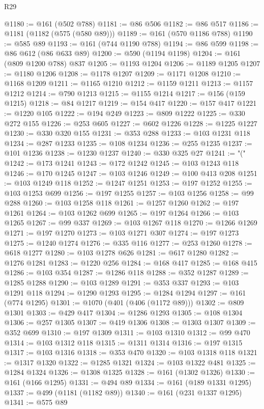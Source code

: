 \begin{lexlean}{R29}
\begin{coremodule}
@1180 := @161 (@502 @788)
@1181 := @86 @506
@1182 := @86 @517
@1186 := @1181 (@1182 (@575 (@580 @89)))
@1189 := @161 (@570 @1186 @788)
@1190 := @585 @89
@1193 := @161 (@744 @1190 @788)
@1194 := @86 @599
@1198 := @86 @612 (@86 @633 @89)
@1200 := @590 (@1194 @1198)
@1204 := @161 (@809 @1200 @788) @837
@1205 := @1193 @1204
@1206 := @1189 @1205
@1207 := @1180 @1206
@1208 := @1178 @1207
@1209 := @1171 @1208
@1210 := @1168 @1209
@1211 := @1165 @1210
@1212 := @1159 @1211
@1213 := @1157 @1212
@1214 := @790 @1213
@1215 := @1155 @1214
@1217 := @156 (@159 @1215)
@1218 := @84 @1217
@1219 := @154 @417
@1220 := @157 @417
@1221 := @1220 @105
@1222 := @194 @249
@1223 := @809 @1222
@1225 := @330 @272 @155
@1226 := @253 @605
@1227 := @602 @1226
@1228 := @1225 @1227
@1230 := @330 @320 @155
@1231 := @353 @288
@1233 := @103 @1231 @118
@1234 := @287 @1233
@1235 := @108 @1234
@1236 := @255 @1235
@1237 := @101 @1236
@1238 := @1230 @1237
@1240 := @330 @325 @27
@1241 := "("
@1242 := @173 @1241
@1243 := @172 @1242
@1245 := @103 @1243 @118
@1246 := @170 @1245
@1247 := @103 @1246
@1249 := @100 @413 @208
@1251 := @103 @1249 @118
@1252 := @1247 @1251
@1253 := @197 @1252
@1255 := @103 @1253 @699
@1256 := @197 @1255
@1257 := @103 @1256
@1258 := @99 @288
@1260 := @103 @1258 @118
@1261 := @1257 @1260
@1262 := @197 @1261
@1264 := @103 @1262 @699
@1265 := @197 @1264
@1266 := @103 @1265
@1267 := @99 @337
@1269 := @103 @1267 @118
@1270 := @1266 @1269
@1271 := @197 @1270
@1273 := @103 @1271 @307
@1274 := @197 @1273
@1275 := @1240 @1274
@1276 := @335 @116
@1277 := @253 @1260
@1278 := @618 @1277
@1280 := @103 @1278 @626
@1281 := @617 @1280
@1282 := @1276 @1281
@1283 := @1220 @256
@1284 := @168 @417
@1285 := @168 @415
@1286 := @103 @354
@1287 := @1286 @118
@1288 := @352 @1287
@1289 := @1285 @1288
@1290 := @103 @1289
@1291 := @353 @337
@1293 := @103 @1291 @118
@1294 := @1290 @1293
@1295 := @1284 @1294
@1297 := @161 (@774 @1295)
@1301 := @1070 (@401 (@406 (@1172 @89)))
@1302 := @809 @1301
@1303 := @429 @417
@1304 := @1286 @1293
@1305 := @108 @1304
@1306 := @257 @1305
@1307 := @419 @1306
@1308 := @1303 @1307
@1309 := @352 @699
@1310 := @197 @1309
@1311 := @103 @1310
@1312 := @99 @470
@1314 := @103 @1312 @118
@1315 := @1311 @1314
@1316 := @197 @1315
@1317 := @103 @1316
@1318 := @353 @470
@1320 := @103 @1318 @118
@1321 := @1317 @1320
@1322 := @1285 @1321
@1324 := @103 @1322 @481
@1325 := @1284 @1324
@1326 := @1308 @1325
@1328 := @161 (@1302 @1326)
@1330 := @161 (@166 @1295)
@1331 := @494 @89
@1334 := @161 (@189 @1331 @1295)
@1337 := @499 (@1181 (@1182 @89))
@1340 := @161 (@231 @1337 @1295)
@1341 := @575 @89

\end{coremodule}
\end{lexlean}

